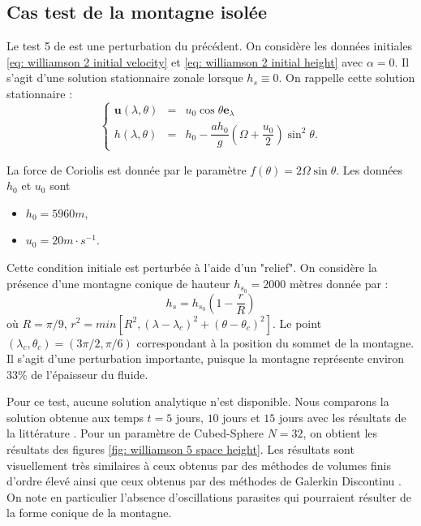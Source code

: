 \subsection{Cas test de la montagne isolée}

Le test 5 de \cite{Williamson1992} est une perturbation du précédent.
On considère les données initiales \eqref{eq: williamson 2 initial velocity} et \eqref{eq: williamson 2 initial height} avec $\alpha = 0$. Il s'agit d'une solution stationnaire zonale lorsque $h_s \equiv 0$. On rappelle cette solution stationnaire :
\begin{equation}
\left\lbrace
\begin{array}{rcl}
\mathbf{u}(\lambda, \theta) & = & u_0 \cos \theta \mathbf{e}_{\lambda} \\
h(\lambda, \theta) & = & h_0 - \dfrac{a h_0}{g} \left( \Omega  + \dfrac{u_0}{2} \right) \sin^2 \theta .
\end{array}
\right.
\end{equation}

La force de Coriolis est donnée par le paramètre $f(\theta) = 2 \Omega \sin \theta$. Les données $h_0$ et $u_0$ sont
\begin{itemize}
\item $h_0 = 5960 \si{m}$,
\item $u_0 = 20 \si{m} \cdot \si{s^{-1}}$.
\end{itemize}
Cette condition initiale est perturbée à l'aide d'un "relief".
On considère la présence d'une montagne conique de hauteur $h_{s_0} = 2000$ mètres donnée par :
\begin{equation}
h_s = h_{s_0} \left( 1 - \dfrac{r}{R} \right)
\end{equation}
où $R= \pi / 9$, $r^2 = min \left[ R^2, \left( \lambda - \lambda_c \right)^2 + \left( \theta - \theta_c \right)^2 \right]$. Le point $(\lambda_c, \theta_c)= (3 \pi / 2, \pi / 6)$ correspondant à la position du sommet de la montagne.
Il s'agit d'une perturbation importante, puisque la montagne représente environ $33 \%$ de l'épaisseur du fluide.

Pour ce test, aucune solution analytique n'est disponible. Nous comparons la solution obtenue aux temps $t=5$ jours, $10$ jours et $15$ jours avec les résultats de la littérature \cite{Ullrich2011, Kuang2016}. Pour un paramètre de Cubed-Sphere $N=32$, on obtient les résultats des figures \ref{fig: williamson 5 space height}. Les résultats sont visuellement très similaires à ceux obtenus par des méthodes de volumes finis \cite{Katta2015, Chen2008} d'ordre élevé ainsi que ceux obtenus par des méthodes de Galerkin Discontinu \cite{Nair2005}. On note en particulier l'absence d'oscillations parasites qui pourraient résulter de la forme conique de la montagne.

